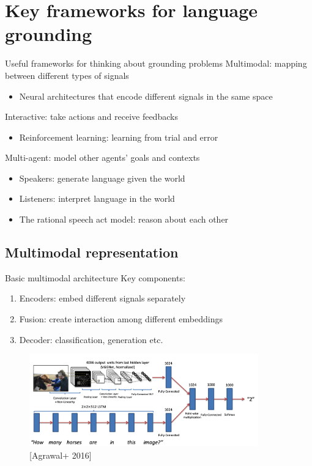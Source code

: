 \documentclass[usenames,dvipsnames,11pt,aspectratio=169]{beamer}
\begin{document}
\section{Key frameworks for language grounding}
\begin{frame}
    {Useful frameworks for thinking about grounding problems}
    Multimodal: mapping between different types of signals\\
    \begin{itemize}
        \item Neural architectures that encode different signals in the same space
    \end{itemize}

    Interactive: take actions and receive feedbacks\\
    \begin{itemize}
        \item Reinforcement learning: learning from trial and error
    \end{itemize}

    Multi-agent: 
            model other agents' goals and contexts\\
    \begin{itemize}
        \item Speakers: generate language given the world 
        \item Listeners: interpret language in the world 
        \item The rational speech act model: reason about each other
    \end{itemize}
\end{frame}

\subsection{Multimodal representation}
\begin{frame}
    {Basic multimodal architecture}
    Key components:\\
    \begin{enumerate}
        \item Encoders: embed different signals separately
        \item Fusion: create interaction among different embeddings 
        \item Decoder: classification, generation etc.
    \end{enumerate}
    \vspace{-1em}

    \begin{figure}
        \includegraphics[height=4cm]{figures/vqa-model}
        \caption{[Agrawal+ 2016]}
    \end{figure}
\end{frame}
\end{document}
